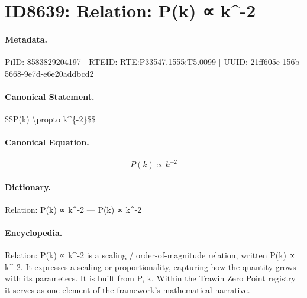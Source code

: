 \section*{ID8639: Relation: P(k) ∝ k\textasciicircum{}-2}
\paragraph{Metadata.}
PiID: 8583829204197 | RTEID: RTE:P33547.1555:T5.0099 | UUID: 21ff605e-156b-5668-9e7d-e6e20addbcd2

\paragraph{Canonical Statement.}
\$\$P(k) \textbackslash{}propto k\textasciicircum{}\{-2\}\$\$

\paragraph{Canonical Equation.}
\[
P(k) \propto k^{-2}
\]

\paragraph{Dictionary.}
Relation: P(k) ∝ k\textasciicircum{}-2 — P(k) ∝ k\textasciicircum{}-2

\paragraph{Encyclopedia.}
Relation: P(k) ∝ k\textasciicircum{}-2 is a scaling / order-of-magnitude relation, written P(k) ∝ k\textasciicircum{}-2. It expresses a scaling or proportionality, capturing how the quantity grows with its parameters. It is built from P, k. Within the Trawin Zero Point registry it serves as one element of the framework's mathematical narrative.
